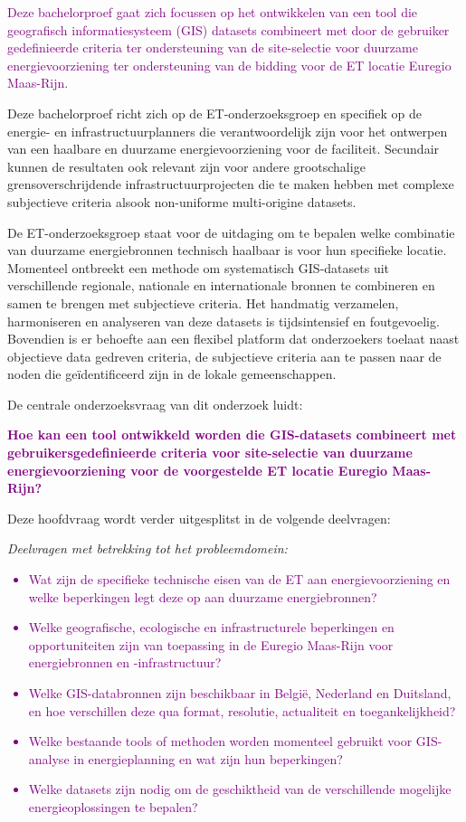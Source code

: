 \textcolor{purple}{Deze bachelorproef gaat zich focussen op het ontwikkelen van een tool die geografisch informatiesysteem (GIS) datasets combineert met door de gebruiker gedefinieerde criteria ter ondersteuning van de site-\-selectie voor duurzame energievoorziening ter ondersteuning van de bidding voor de ET locatie Euregio Maas-\-Rijn.}

Deze bachelorproef richt zich op de ET-\-onderzoeksgroep en specifiek op de energie- en infrastructuurplanners die verantwoordelijk zijn voor het ontwerpen van een haalbare en duurzame energievoorziening voor de faciliteit. Secundair kunnen de resultaten ook relevant zijn voor andere grootschalige grensoverschrijdende infrastructuurprojecten die te maken hebben met complexe subjectieve criteria alsook non-\-uniforme multi-\-origine datasets.

De ET-\-onderzoeksgroep staat voor de uitdaging om te bepalen welke combinatie van duurzame energiebronnen technisch haalbaar is voor hun specifieke locatie. Momenteel ontbreekt een methode om systematisch GIS-\-datasets uit verschillende regionale, nationale en internationale bronnen te combineren en samen te brengen met subjectieve criteria. Het handmatig verzamelen, harmoniseren en analyseren van deze datasets is tijdsintensief en foutgevoelig. Bovendien is er behoefte aan een flexibel platform dat onderzoekers toelaat naast objectieve data gedreven criteria, de subjectieve criteria aan te passen naar de noden die geïdentificeerd zijn in de lokale gemeenschappen.

De centrale onderzoeksvraag van dit onderzoek luidt: 

\textcolor{purple}{\textbf{Hoe kan een tool ontwikkeld worden die GIS-\-datasets combineert met gebruikersgedefinieerde criteria voor site-\-selectie van duurzame energievoorziening voor de voorgestelde ET locatie Euregio Maas-\-Rijn?}}

Deze hoofdvraag wordt verder uitgesplitst in de volgende deelvragen:

\textit{Deelvragen met betrekking tot het probleemdomein:}
\textcolor{purple}{\begin{itemize}
    \item Wat zijn de specifieke technische eisen van de ET aan energievoorziening en welke beperkingen legt deze op aan duurzame energiebronnen?
    \item Welke geografische, ecologische en infrastructurele beperkingen en opportuniteiten zijn van toepassing in de Euregio Maas-\-Rijn voor energiebronnen en -infrastructuur?
    \item Welke GIS-\-databronnen zijn beschikbaar in België, Nederland en Duitsland, en hoe verschillen deze qua format, resolutie, actualiteit en toegankelijkheid?
    \item Welke bestaande tools of methoden worden momenteel gebruikt voor GIS-\-analyse in energieplanning en wat zijn hun beperkingen?
    \item Welke datasets zijn nodig om de geschiktheid van de verschillende mogelijke energieoplossingen te bepalen?
\end{itemize}}

